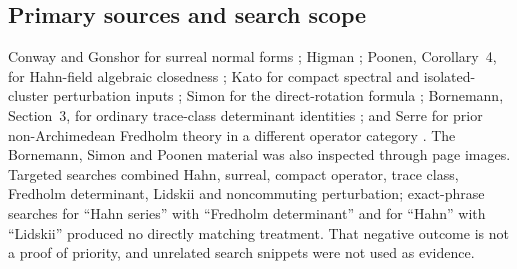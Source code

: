 \documentclass[11pt,a4paper]{article}
\numberwithin{equation}{section}
\theoremstyle{definition}
\theoremstyle{remark}
\begin{document}
\subsection{Primary sources and search scope}\label{ihs:app:sourcesD}
Conway and Gonshor for surreal normal forms \cite{Conway,Gonshor}; Higman
\cite{Higman}; Poonen, Corollary~4, for Hahn-field algebraic closedness
\cite{Poonen}; Kato for compact spectral and isolated-cluster perturbation
inputs \cite{Kato}; Simon for the direct-rotation formula
\cite{SimonProjections}; Bornemann, Section~3, for ordinary trace-class
determinant identities \cite{Bornemann}; and Serre for prior
non-Archimedean Fredholm theory in a different operator category
\cite{Serre}. The Bornemann, Simon and Poonen material was also inspected
through page images. Targeted searches combined Hahn, surreal, compact
operator, trace class, Fredholm determinant, Lidskii and noncommuting
perturbation; exact-phrase searches for ``Hahn series'' with ``Fredholm
determinant'' and for ``Hahn'' with ``Lidskii'' produced no directly
matching treatment. That negative outcome is not a proof of priority, and
unrelated search snippets were not used as evidence.
\end{document}
